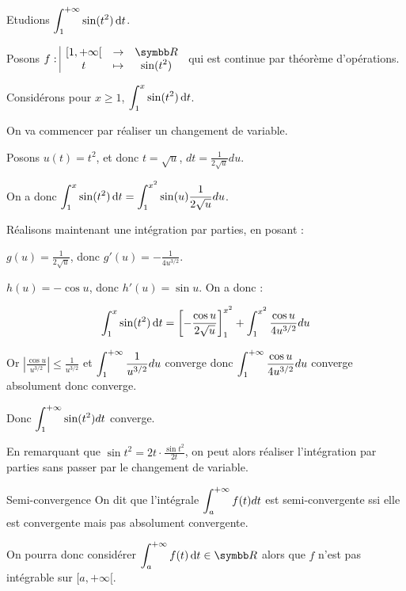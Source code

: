\begin{exemple}
    Etudions $\displaystyle \int_{1}^{+ \infty } \sin(t^2) \,\mathrm{d}t$.

    Posons $\fonction f {[1, + \infty[}{\R}{t}{\sin(t^2)}$ qui est continue par théorème d'opérations.

    Considérons pour $x \geqslant 1$, $\displaystyle \int_{1 }^{x } \sin(t^2) \,\mathrm{d}t$.

    On va commencer par réaliser un changement de variable.

    Posons $u(t) = t^2$, et donc $t = \sqrt u$, $dt = \frac{1}{2 \sqrt u} du$.

    On a donc $\displaystyle \int_{1 }^{x } \sin(t^2) \,\mathrm{d}t = \int_{1}^{x^2} \sin(u) \frac{1}{2 \sqrt u} du$.

    \avspace Réalisons maintenant une intégration par parties, en posant : 

    $g(u) = \frac{1}{2 \sqrt u}$, donc $g'(u) = - \frac{1}{4 u^{3/2}}$.

    $h(u) = - \cos u$, donc $h'(u) = \sin u$.
    On a donc :

    $$ \int_{1 }^{x } \sin(t^2) \,\mathrm{d}t = \left[ - \frac{\cos u}{2 \sqrt u} \right]_{1}^{x^2} + \int_{1}^{x^2} \frac{\cos u}{4 u^{3/2}} du $$

    Or $\left| \frac{\cos u  }{u^{3/2}} \right| \leqslant \frac{1}{u^{3/2}}$ et $\displaystyle \int_{1}^{+ \infty} \frac{1}{u^{3/2}} du$ converge donc
    $\displaystyle \int_{1}^{+ \infty} \frac{\cos u}{4 u^{3/2}} du$ converge absolument donc converge.

    Donc $\displaystyle \int_{1}^{+ \infty} \sin(t^2) dt$ converge.


    En remarquant que $\sin t^2 = 2t \cdot \frac{\sin t^2}{2t}$, on peut alors réaliser l'intégration par parties 
    sans passer par le changement de variable.
\end{exemple}


\begin{definition}{Semi-convergence}{}
    On dit que l'intégrale $\displaystyle \int_a^{+ \infty} f(t) dt$ est semi-convergente ssi elle 
    est convergente mais pas absolument convergente.

    On pourra donc considérer $\ds \int_{a }^{+ \infty}  f(t) \dt \in \R$ alors 
    que $f$ n'est pas intégrable sur $[a, + \infty[$.
\end{definition}


